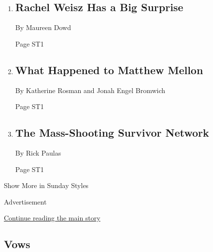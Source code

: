 \begin{enumerate}
\def\labelenumi{\arabic{enumi}.}
\item
  \href{/2018/04/20/style/rachel-weisz-disobedience-movie.html}{}

  \hypertarget{rachel-weisz-has-a-big-surprise}{%
  \subsection{Rachel Weisz Has a Big
  Surprise}\label{rachel-weisz-has-a-big-surprise}}

  By Maureen Dowd

  Page ST1
\item
  \href{/2018/04/20/style/matthew-mellon-dead.html}{}

  \hypertarget{what-happened-to-matthew-mellon}{%
  \subsection{What Happened to Matthew
  Mellon}\label{what-happened-to-matthew-mellon}}

  By Katherine Rosman and Jonah Engel Bromwich

  Page ST1
\item
  \href{/2018/04/22/style/gun-survivors-network-shooting.html}{}

  \hypertarget{the-mass-shooting-survivor-network}{%
  \subsection{The Mass-Shooting Survivor
  Network}\label{the-mass-shooting-survivor-network}}

  By Rick Paulas

  Page ST1
\end{enumerate}

Show More in Sunday Styles

Advertisement

\protect\hyperlink{after-mid7}{Continue reading the main story}

\hypertarget{vows}{%
\subsection{Vows}\label{vows}}

